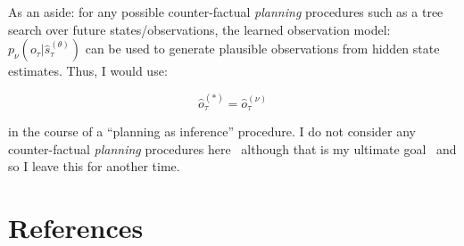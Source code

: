 \documentclass{article}
\begin{document}
As an aside: for any possible counter-factual \textit{planning} procedures such as a tree search over future states/observations, the learned observation model: $p_{\nu}(o_{\tau} | \hat{s}_{\tau}^{(\theta)})$ can be used to generate plausible observations from hidden state estimates. Thus, I would use:

\begin{equation}
    \label{eq:future_obs}
    \hat{o}_{\tau}^{(*)} = \hat{o}_{\tau}^{(\nu)}
\end{equation}

in the course of a ``planning as inference'' procedure. I do not consider any counter-factual \textit{planning} procedures here \textemdash \ although that is my ultimate goal \textemdash \ and so I leave this for another time. 

\section{References}

\printbibliography
\end{document}
